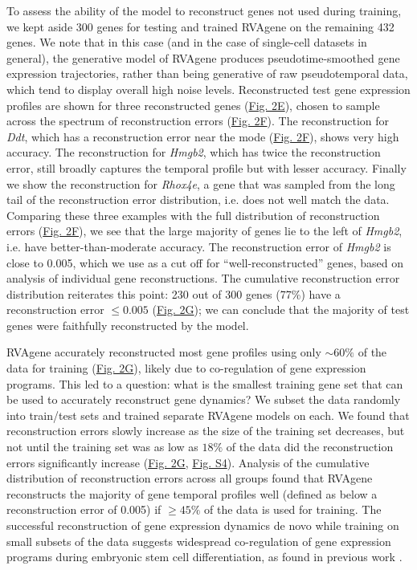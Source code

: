 {
To assess the ability of the model to reconstruct genes not used during training, we kept aside 300 genes for testing and trained RVAgene on the remaining 432 genes.
We note that in this case (and in the case of single-cell datasets in general), the generative model of RVAgene produces pseudotime-smoothed gene expression trajectories, rather than being generative of raw pseudotemporal data, which tend to display overall high noise levels.
}
Reconstructed test gene expression profiles are shown for three reconstructed genes (\hyperref[fig:fig3]{Fig. 2E}), chosen to sample across the spectrum of reconstruction errors (\hyperref[fig:fig3]{Fig. 2F}). The reconstruction for {\em Ddt}, which has a reconstruction error near the mode (\hyperref[fig:fig3]{Fig. 2F}), shows very high accuracy. The reconstruction for {\em Hmgb2}, which has twice the reconstruction error, still broadly captures the temporal profile but with lesser accuracy. Finally we show the reconstruction for {\em Rhox4e}, a gene that was sampled from the long tail of the reconstruction error distribution, i.e. does not well match the data. Comparing these three examples with the full distribution of reconstruction errors  (\hyperref[fig:fig3]{Fig. 2F}), we see that the large majority of genes lie to the left of {\em Hmgb2}, i.e. have better-than-moderate accuracy. The reconstruction error of {\em Hmgb2} is close to 0.005, which we use as a cut off for ``well-reconstructed'' genes, based on analysis of individual gene reconstructions. The cumulative reconstruction error distribution reiterates this point: 230 out of 300 genes (77\%) have a reconstruction error $\leq 0.005$ (\hyperref[fig:fig3]{Fig. 2G}); we can conclude that the majority of test genes were faithfully reconstructed by the model.
\par
RVAgene accurately reconstructed most gene profiles using only $\sim60 {\%}$ of the data for training (\hyperref[fig:fig3]{Fig. 2G}), likely due to co-regulation of gene expression programs. This led to a question: what is the smallest training gene set that can be used to accurately reconstruct gene dynamics? We subset the data randomly into train/test sets and trained separate RVAgene models on each. We found that reconstruction errors slowly increase as the size of the training set decreases, but not until the training set was as low as $18\%$ of the data did the reconstruction errors significantly increase (\hyperref[fig:fig3]{Fig. 2G}, \hyperref[supp]{Fig. S4}). Analysis of the cumulative distribution of reconstruction errors across all groups found that RVAgene reconstructs the majority of gene temporal profiles well (defined as below a reconstruction error of 0.005) if $\geq 45\%$ of the data is used for training. The successful reconstruction of gene expression dynamics de novo while training on  small subsets of the data suggests widespread co-regulation of gene expression programs during embryonic stem cell differentiation, as found in previous work \citep{jang2017dynamics}.

